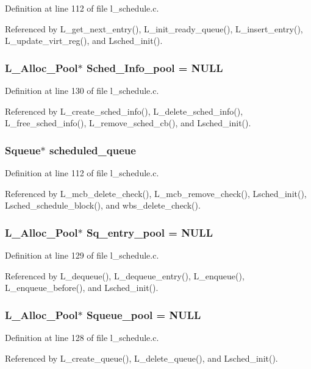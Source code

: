 Definition at line 112 of file l\_\-schedule.c.

Referenced by L\_\-get\_\-next\_\-entry(), L\_\-init\_\-ready\_\-queue(), L\_\-insert\_\-entry(), L\_\-update\_\-virt\_\-reg(), and Lsched\_\-init().
\subsubsection{\setlength{\rightskip}{0pt plus 5cm}\bf{L\_\-Alloc\_\-Pool}$\ast$ \bf{Sched\_\-Info\_\-pool} = \bf{NULL}}\label{l__schedule_8c_373147875f98887da63ee267f1ac4cfe}




Definition at line 130 of file l\_\-schedule.c.

Referenced by L\_\-create\_\-sched\_\-info(), L\_\-delete\_\-sched\_\-info(), L\_\-free\_\-sched\_\-info(), L\_\-remove\_\-sched\_\-cb(), and Lsched\_\-init().
\subsubsection{\setlength{\rightskip}{0pt plus 5cm}\bf{Squeue}$\ast$ \bf{scheduled\_\-queue}}\label{l__schedule_8c_b45d8d03ce37d7b7cf89b0321c5d3c28}




Definition at line 112 of file l\_\-schedule.c.

Referenced by L\_\-mcb\_\-delete\_\-check(), L\_\-mcb\_\-remove\_\-check(), Lsched\_\-init(), Lsched\_\-schedule\_\-block(), and wbs\_\-delete\_\-check().
\subsubsection{\setlength{\rightskip}{0pt plus 5cm}\bf{L\_\-Alloc\_\-Pool}$\ast$ \bf{Sq\_\-entry\_\-pool} = \bf{NULL}}\label{l__schedule_8c_905d903f4a74734bcd6535bdc20f5c84}




Definition at line 129 of file l\_\-schedule.c.

Referenced by L\_\-dequeue(), L\_\-dequeue\_\-entry(), L\_\-enqueue(), L\_\-enqueue\_\-before(), and Lsched\_\-init().
\subsubsection{\setlength{\rightskip}{0pt plus 5cm}\bf{L\_\-Alloc\_\-Pool}$\ast$ \bf{Squeue\_\-pool} = \bf{NULL}}\label{l__schedule_8c_70490b1c3107e1406d0a788c58460d61}




Definition at line 128 of file l\_\-schedule.c.

Referenced by L\_\-create\_\-queue(), L\_\-delete\_\-queue(), and Lsched\_\-init().